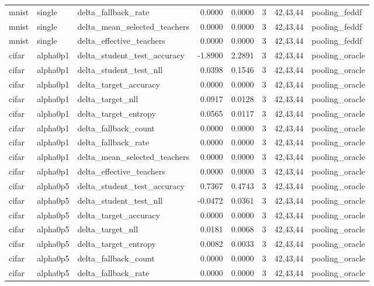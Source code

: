 \begin{tabular}{lllrrrll}
mnist & single & delta\_fallback\_rate & 0.0000 & 0.0000 & 3 & 42,43,44 & pooling\_feddf \\
mnist & single & delta\_mean\_selected\_teachers & 0.0000 & 0.0000 & 3 & 42,43,44 & pooling\_feddf \\
mnist & single & delta\_effective\_teachers & 0.0000 & 0.0000 & 3 & 42,43,44 & pooling\_feddf \\
cifar & alpha0p1 & delta\_student\_test\_accuracy & -1.8900 & 2.2891 & 3 & 42,43,44 & pooling\_oracle \\
cifar & alpha0p1 & delta\_student\_test\_nll & 0.0398 & 0.1546 & 3 & 42,43,44 & pooling\_oracle \\
cifar & alpha0p1 & delta\_target\_accuracy & 0.0000 & 0.0000 & 3 & 42,43,44 & pooling\_oracle \\
cifar & alpha0p1 & delta\_target\_nll & 0.0917 & 0.0128 & 3 & 42,43,44 & pooling\_oracle \\
cifar & alpha0p1 & delta\_target\_entropy & 0.0565 & 0.0117 & 3 & 42,43,44 & pooling\_oracle \\
cifar & alpha0p1 & delta\_fallback\_count & 0.0000 & 0.0000 & 3 & 42,43,44 & pooling\_oracle \\
cifar & alpha0p1 & delta\_fallback\_rate & 0.0000 & 0.0000 & 3 & 42,43,44 & pooling\_oracle \\
cifar & alpha0p1 & delta\_mean\_selected\_teachers & 0.0000 & 0.0000 & 3 & 42,43,44 & pooling\_oracle \\
cifar & alpha0p1 & delta\_effective\_teachers & 0.0000 & 0.0000 & 3 & 42,43,44 & pooling\_oracle \\
cifar & alpha0p5 & delta\_student\_test\_accuracy & 0.7367 & 0.4743 & 3 & 42,43,44 & pooling\_oracle \\
cifar & alpha0p5 & delta\_student\_test\_nll & -0.0472 & 0.0361 & 3 & 42,43,44 & pooling\_oracle \\
cifar & alpha0p5 & delta\_target\_accuracy & 0.0000 & 0.0000 & 3 & 42,43,44 & pooling\_oracle \\
cifar & alpha0p5 & delta\_target\_nll & 0.0181 & 0.0068 & 3 & 42,43,44 & pooling\_oracle \\
cifar & alpha0p5 & delta\_target\_entropy & 0.0082 & 0.0033 & 3 & 42,43,44 & pooling\_oracle \\
cifar & alpha0p5 & delta\_fallback\_count & 0.0000 & 0.0000 & 3 & 42,43,44 & pooling\_oracle \\
cifar & alpha0p5 & delta\_fallback\_rate & 0.0000 & 0.0000 & 3 & 42,43,44 & pooling\_oracle \\

\end{tabular}

